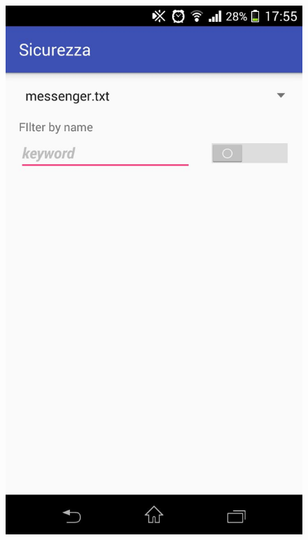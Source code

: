 \documentclass[12pt]{article} %
\begin{document}
\begin{figure}[htbp]
{\includegraphics[scale=0.2]{./activity2.jpeg}}\qquad\qquad
\\
%

\end{figure}
\end{document}
